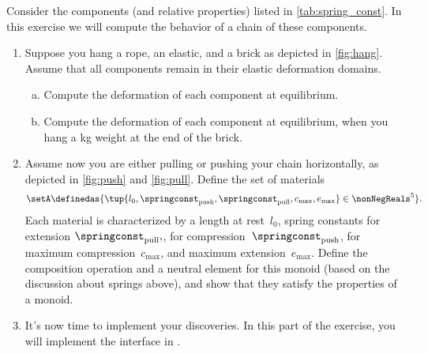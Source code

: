 \begin{gradedexercise}
	\label{ex:Goldberg}
	Consider the components (and relative properties) listed in \cref{tab:spring_const}.
	In this exercise we will compute the behavior of a chain of these components.
	\begin{enumerate}
		\item Suppose you hang a rope, an elastic, and a brick as depicted in \cref{fig:hang}.
		      Assume that all components remain in their elastic deformation domains.
		      \begin{enumerate}[(a)]
			      \item Compute the deformation of each component at equilibrium.
			      \item Compute the deformation of each component at equilibrium, when you hang a \unit[1]{kg} weight at the end of the brick.
		      \end{enumerate}
		\item Assume now you are either pulling or pushing your chain horizontally, as depicted in \cref{fig:push} and \cref{fig:pull}.
		      Define the set of materials~
		      \begin{equation}
			      \setA\definedas \{ \tup{l_0, \springconst_\mathrm{push},\springconst_\mathrm{pull}, c_\mathrm{max}, e_\mathrm{max}} \in \nonNegReals^5\}.
		      \end{equation}
		      Each material is characterized by a length at rest~$l_0$, spring constants for extension $\springconst_\mathrm{pull},$, for compression~$\springconst_\mathrm{push}$, for maximum compression~$c_\mathrm{max}$, and maximum extension~$e_\mathrm{max}$.
		      Define the composition operation and a neutral element for this monoid (based on the discussion about springs above), and show that they satisfy the properties of a monoid.
		\item It's now time to implement your discoveries.
		      In this part of the exercise, you will implement the interface in .


\end{enumerate}
\end{gradedexercise}
